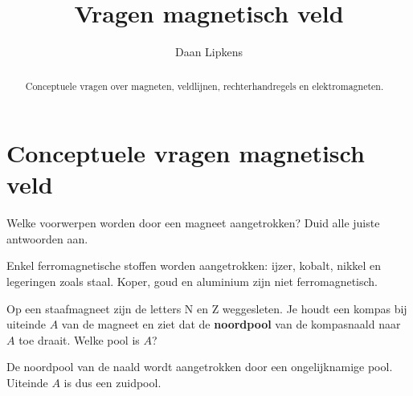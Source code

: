 \documentclass{ximera}
\title{Vragen magnetisch veld}
\author{Daan Lipkens}
\begin{document}
\begin{abstract}
    Conceptuele vragen over magneten, veldlijnen, rechterhandregels en elektromagneten.
\end{abstract}
\maketitle

\section{Conceptuele vragen magnetisch veld}

\begin{question}
    Welke voorwerpen worden door een magneet aangetrokken? Duid alle juiste antwoorden aan.

    \begin{selectAll}
    \end{selectAll}

    \begin{solution}\nl
        Enkel ferromagnetische stoffen worden aangetrokken: ijzer, kobalt, nikkel en legeringen zoals staal. Koper, goud en aluminium zijn niet ferromagnetisch.
    \end{solution}
\end{question}

\begin{question}
    Op een staafmagneet zijn de letters N en Z weggesleten. Je houdt een kompas bij uiteinde $A$ van de magneet en ziet dat de \textbf{noordpool} van de kompasnaald naar $A$ toe draait. Welke pool is $A$?

    \begin{multipleChoice}
    \end{multipleChoice}

    \begin{solution}\nl
        De noordpool van de naald wordt aangetrokken door een ongelijknamige pool. Uiteinde $A$ is dus een zuidpool.
    \end{solution}
\end{question}
\end{document}
